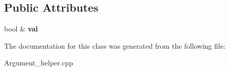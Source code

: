 \subsection*{Public Attributes}
\begin{DoxyCompactItemize}
\item 
\hypertarget{classdsr_1_1_argument__helper_1_1_flag_target_a7671d7ad6767cf131f5d456b892b0a80}{
bool \& {\bfseries val}}
\label{classdsr_1_1_argument__helper_1_1_flag_target_a7671d7ad6767cf131f5d456b892b0a80}

\end{DoxyCompactItemize}


The documentation for this class was generated from the following file:\begin{DoxyCompactItemize}
\item 
Argument\_\-helper.cpp\end{DoxyCompactItemize}
